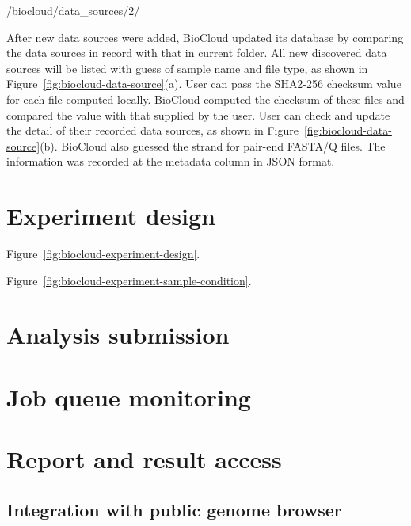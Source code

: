 \begin{CVerbatim}[fontsize=\small]
/biocloud/data_sources/2/
\end{CVerbatim}

\vspace{-1em}\noindent
After new data sources were added, BioCloud updated its database by comparing
the data sources in record with that in current folder.  All new discovered
data sources will be listed with guess of sample name and file type, as shown
in Figure~\ref{fig:biocloud-data-source}(a). User can pass the SHA2-256
checksum value for each file computed locally. BioCloud computed the checksum
of these files and compared the value with that supplied by the user. User can
check and update the detail of their recorded data sources, as shown in
Figure~\ref{fig:biocloud-data-source}(b). BioCloud also guessed the strand for
pair-end FASTA/Q files. The information was recorded at the metadata column in
JSON format.





\section{Experiment design}

Figure~\ref{fig:biocloud-experiment-design}.



Figure~\ref{fig:biocloud-experiment-sample-condition}.




\section{Analysis submission}


\section{Job queue monitoring}


\section{Report and result access}
\label{s:report-result-access}

\subsection{Integration with public genome browser}


